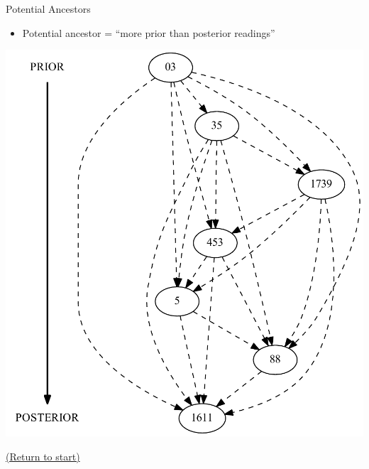 \documentclass[10pt]{beamer}
\begin{document}
	\begin{frame}{Potential Ancestors}\label{slide:potential-ancestors}
		\begin{itemize}
			\item Potential ancestor = ``more prior than posterior readings''
		\end{itemize}
		\begin{center}
			\includegraphics[scale=0.3333]{../graphics/potential-ancestors.pdf}
		\end{center}
		\begin{center}
			\hyperlink{slide:crossroad}{(Return to start)}
		\end{center}
	\end{frame}
\end{document}
